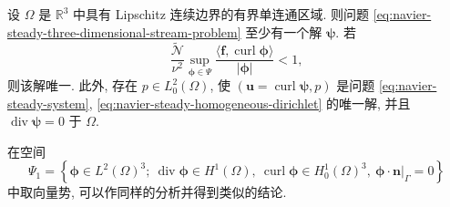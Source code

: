 \setcounter{statement}{4}
\begin{Theorem}\label{thm:navier-steady-three-dimensional-stream-wellposed}
设 $\Omega$ 是 $\mathbb R^3$ 中具有 Lipschitz 连续边界的有界单连通区域.
则问题 \eqref{eq:navier-steady-three-dimensional-stream-problem} 至少有一个解
$\boldsymbol\psi$. 若
\begin{equation}\label{eq:navier-steady-three-dimensional-small-data}
\frac{\widetilde{\mathcal N}}{\nu^2}
\sup_{\boldsymbol\phi\in\Psi}
\frac{\langle\mathbf f,\operatorname{curl}\boldsymbol\phi\rangle}
{|\boldsymbol\phi|}<1,
\end{equation}
则该解唯一. 此外, 存在 $p\in L_0^2(\Omega)$, 使
$(\mathbf u=\operatorname{curl}\boldsymbol\psi,p)$ 是问题
\eqref{eq:navier-steady-system},
\eqref{eq:navier-steady-homogeneous-dirichlet} 的唯一解, 并且
$\operatorname{div}\boldsymbol\psi=0$ 于 $\Omega$.
\end{Theorem}

\setcounter{statement}{2}
\begin{Remark}\label{rem:navier-steady-normal-potential-space}
在空间
\[
\Psi_1=\left\{\boldsymbol\phi\in L^2(\Omega)^3;
\ \operatorname{div}\boldsymbol\phi\in H^1(\Omega),
\ \operatorname{curl}\boldsymbol\phi\in H_0^1(\Omega)^3,
\ \boldsymbol\phi\cdot\mathbf n|_\Gamma=0\right\}
\]
中取向量势, 可以作同样的分析并得到类似的结论.
\end{Remark}
